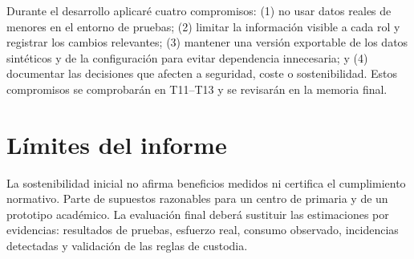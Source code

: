 Durante el desarrollo aplicaré cuatro compromisos: (1) no usar datos reales de menores en el entorno de pruebas; (2) limitar la información visible a cada rol y registrar los cambios relevantes; (3) mantener una versión exportable de los datos sintéticos y de la configuración para evitar dependencia innecesaria; y (4) documentar las decisiones que afecten a seguridad, coste o sostenibilidad. Estos compromisos se comprobarán en T11–T13 y se revisarán en la memoria final.

\section{Límites del informe}\label{sec:sost-7}

La sostenibilidad inicial no afirma beneficios medidos ni certifica el cumplimiento normativo. Parte de supuestos razonables para un centro de primaria y de un prototipo académico. La evaluación final deberá sustituir las estimaciones por evidencias: resultados de pruebas, esfuerzo real, consumo observado, incidencias detectadas y validación de las reglas de custodia.

